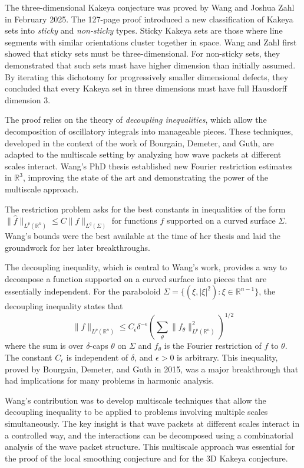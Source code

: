 The three-dimensional Kakeya conjecture was proved by Wang and Joshua Zahl in February 2025. The 127-page proof introduced a new classification of Kakeya sets into \emph{sticky} and \emph{non-sticky} types. Sticky Kakeya sets are those where line segments with similar orientations cluster together in space. Wang and Zahl first showed that sticky sets must be three-dimensional. For non-sticky sets, they demonstrated that such sets must have higher dimension than initially assumed. By iterating this dichotomy for progressively smaller dimensional defects, they concluded that every Kakeya set in three dimensions must have full Hausdorff dimension 3.

The proof relies on the theory of \emph{decoupling inequalities}, which allow the decomposition of oscillatory integrals into manageable pieces. These techniques, developed in the context of the work of Bourgain, Demeter, and Guth, are adapted to the multiscale setting by analyzing how wave packets at different scales interact. Wang's PhD thesis established new Fourier restriction estimates in $\mathbb{R}^3$, improving the state of the art and demonstrating the power of the multiscale approach.

The restriction problem asks for the best constants in inequalities of the form $\|\hat{f}\|_{L^p(\mathbb{R}^n)} \le C\|f\|_{L^q(\Sigma)}$ for functions $f$ supported on a curved surface $\Sigma$. Wang's bounds were the best available at the time of her thesis and laid the groundwork for her later breakthroughs.

The decoupling inequality, which is central to Wang's work, provides a way to decompose a function supported on a curved surface into pieces that are essentially independent. For the paraboloid $\Sigma = \{(\xi, |\xi|^2) : \xi \in \mathbb{R}^{n-1}\}$, the decoupling inequality states that
\[
\|f\|_{L^p(\mathbb{R}^n)} \le C_\epsilon \delta^{-\epsilon} \left(\sum_{\theta} \|f_\theta\|_{L^p(\mathbb{R}^n)}^2\right)^{1/2}
\]
where the sum is over $\delta$-caps $\theta$ on $\Sigma$ and $f_\theta$ is the Fourier restriction of $f$ to $\theta$. The constant $C_\epsilon$ is independent of $\delta$, and $\epsilon > 0$ is arbitrary. This inequality, proved by Bourgain, Demeter, and Guth in 2015, was a major breakthrough that had implications for many problems in harmonic analysis.

Wang's contribution was to develop multiscale techniques that allow the decoupling inequality to be applied to problems involving multiple scales simultaneously. The key insight is that wave packets at different scales interact in a controlled way, and the interactions can be decomposed using a combinatorial analysis of the wave packet structure. This multiscale approach was essential for the proof of the local smoothing conjecture and for the 3D Kakeya conjecture.

